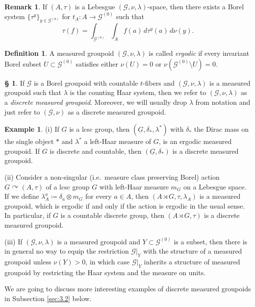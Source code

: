 \documentclass[11pt, oneside]{amsart}
\theoremstyle{definition}
\newtheorem{defn}[lemma]{Definition}
\newtheorem{example}[lemma]{Example}
\newtheorem{no}[lemma]{\S}
\newtheorem{remark}[lemma]{Remark}
\theoremstyle{remark}
\theoremstyle{TheoremNum}
\newcommand{\cG}{\mathcal{G}}
\begin{document}
\begin{remark} If $(A, \tau)$ is a Lebesgue $(\cG, \nu, \lambda)$-space, then there exists a Borel system $\{ \tau^y\}_{y \in \cG^{(0)}}$ for $t_A: A \to \cG^{(0)}$ such that
\begin{equation}\label{taudisintegration}
\tau(f) = \int_{\cG^{(0)}} \int_A f(a) \, d\tau^y(a) \, d \nu(y).
\end{equation}
\end{remark}
\begin{defn}
A measured groupoid $(\mathcal{G},\nu,\lambda)$ is called \emph{ergodic} if every invariant Borel subset $U\subset \mathcal{G}^{(0)}$ satisfies either $\nu(U)=0$ or $\nu(\mathcal{G}^{(0)}\setminus U)=0$.
\end{defn}
\begin{no} If $\cG$ is a Borel groupoid with countable $t$-fibers and $(\cG, \nu, \lambda)$ is a measured groupoid such that $\lambda$ is the counting Haar system, then we refer to $(\cG, \nu, \lambda)$ as a \emph{discrete measured groupoid}. Moreover, we will usually drop $\lambda$ from notation and just refer to $(\cG, \nu)$ as a discrete measured groupoid.
\end{no}
\begin{example}
(i) If $G$ is a lcsc group, then $(\underline{G},\delta_*, \lambda^*)$ with $\delta_*$ the Dirac mass on the single object $*$ and $\lambda^{*}$ a left-Haar measure of $G$, is an ergodic measured groupoid. If $G$ is discrete and countable, then $(\underline{G},\delta_*)$ is a discrete measured groupoid. 
\item (ii) Consider a  non-singular (i.e.\ measure class preserving Borel) action $G\curvearrowright (A,\tau)$ of a lcsc group $G$ with left-Haar measure $m_G$ on a Lebesgue space. If we define $\lambda_A^a \coloneqq \delta_a \otimes m_G$ for every $a \in A$, then
$(A \rtimes G, \tau, \lambda_A)$ is a measured groupoid, which is ergodic if and only if the action is ergodic in the usual sense. In particular, if $G$ is a countable discrete group, then $(A \rtimes G, \tau)$ is a discrete measured groupoid.
\item (iii) If $(\cG, \nu, \lambda)$ is a measured groupoid and $Y \subset \cG^{(0)}$ is a subset, then there is in general no way to equip the restriction $\cG|_{Y}$ with the structure of a measured groupoid unless $\nu(Y)>0$, in which case $\cG|_Y$ inherits a structure of measured groupoid by restricting the Haar system and the measure on units.
\end{example}
We are going to discuss more interesting examples of discrete measured groupoids in Subsection \ref{sec:3.2} below.
\end{document}
